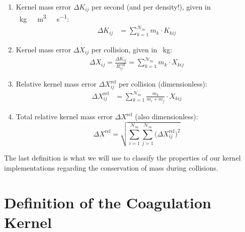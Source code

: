         \begin{enumerate}

            \item Kernel mass error $\Delta K_{ij}$ per second (and per density!),
                given in \SI{}{\kilogram\ \meter^3\ \second^{-1}}: 
                \begin{align}
                    \Delta K_{ij} &= \sum_{k=1}^{\mathcal N_m} m_k \cdot K_{kij}
                \end{align}

            \item Kernel mass error $\Delta X_{ij}$ per collision, 
                given in \SI{}{\kilogram}: 
                \begin{align}
                    \Delta X_{ij}
                        = \frac{\Delta K_{ij}}{R^\text{coll}_{ij}}
                        = \sum_{k=1}^{\mathcal N_m} m_k \cdot X_{kij}
                \end{align}

            \item Relative kernel mass error $\Delta X_{ij}^\text{rel}$ per collision 
                (dimensionless):
                \begin{align}
                    \Delta X_{ij}^\text{rel} 
                        &= \sum_{k=1}^{\mathcal N_m} \frac{m_k}{m_i+m_j} \cdot X_{kij}
                \end{align}

            \item Total relative kernel mass error $\Delta X^\text{rel}$
                (also dimensionless):
                \begin{equation}
                    \boxed{
                        \Delta X^\text{rel} = \sqrt{
                            \sum_{i=1}^{\mathcal N_m}
                            \sum_{j=1}^{\mathcal N_m}
                            \big(\Delta X_{ij}^\text{rel}\big)^2
                        }
                    }
                \end{equation}

        \end{enumerate}

        The last definition is what we will use to classify the properties of our 
        kernel implementations regarding the conservation of mass during collisions.


\clearpage\section{Definition of the Coagulation Kernel}
\label{sec:coagulation_kernel}

